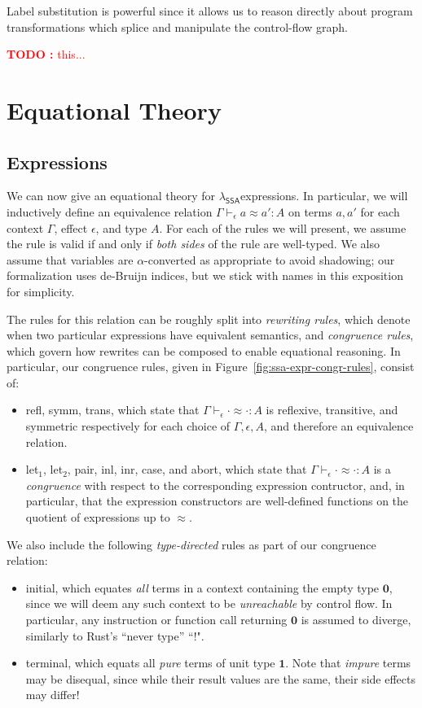 \documentclass[acmsmall,screen,review]{acmart}
\newcounter{todos}
\newcommand{\TODO}[1]{{
  \stepcounter{todos}
  \begin{center}\large{\textcolor{red}{\textbf{TODO \arabic{todos}:} #1}}\end{center}
}}
\newcommand{\mb}[1]{\ensuremath{\mathbf{#1}}}
\newcommand{\ms}[1]{\ensuremath{\mathsf{#1}}}
\newcommand{\teqv}{\approx}
\newcommand{\tmeq}[5]{#1 \vdash_{#2} #3 \teqv #4 : {#5}}
\newcommand{\brle}[1]{{\scriptsize\textsf{#1}}}
\newcommand{\isotopessa}{\(\lambda_{\ms{SSA}}\)}
\begin{document}
Label substitution is powerful since it allows us to reason directly about
program transformations which splice and manipulate the control-flow graph.

\TODO{this...}

\section{Equational Theory}

\label{sec:equations}

\subsection{Expressions}

We can now give an equational theory for \isotopessa expressions. In particular,
we will inductively define an equivalence relation
$
\tmeq{\Gamma}{\epsilon}{a}{a'}{A}
$
on terms $a, a'$ for each context $\Gamma$, effect $\epsilon$, and type $A$. For each of the rules
we will present, we assume the rule is valid if and only if \emph{both sides} of the rule are
well-typed. We also assume that variables are $\alpha$-converted as appropriate to avoid shadowing;
our formalization uses de-Bruijn indices, but we stick with names in this exposition for simplicity.

The rules for this relation can be roughly split into \emph{rewriting rules}, which denote when two
particular expressions have equivalent semantics, and \emph{congruence rules}, which govern how
rewrites can be composed to enable equational reasoning. In particular, our congruence rules, given
in Figure~\ref{fig:ssa-expr-congr-rules}, consist of:
\begin{itemize}
  \item \brle{refl}, \brle{symm}, \brle{trans}, which state that
  $\tmeq{\Gamma}{\epsilon}{\cdot}{\cdot}{A}$ is reflexive, transitive, and symmetric respectively
  for each choice of $\Gamma, \epsilon, A$, and therefore an equivalence relation.
  \item \brle{let$_1$}, \brle{let$_2$}, \brle{pair}, \brle{inl}, \brle{inr}, \brle{case}, and
  \brle{abort}, which state that $\tmeq{\Gamma}{\epsilon}{\cdot}{\cdot}{A}$ is a \emph{congruence}
  with respect to the corresponding expression contructor, and, in particular, that the expression
  constructors are well-defined functions on the quotient of expressions up to $\teqv$.
\end{itemize} 
We also include the following \emph{type-directed} rules as part of our congruence relation:
\begin{itemize}
  \item \brle{initial}, which equates \emph{all} terms in a context containing the empty type
  $\mb{0}$, since we will deem any such context to be \emph{unreachable} by control flow. In
  particular, any instruction or function call returning $\mb{0}$ is assumed to diverge, similarly
  to Rust's ``never type'' ``$!$".
  \item \brle{terminal}, which equats all \emph{pure} terms of unit type $\mb{1}$. Note that
  \emph{impure} terms may be disequal, since while their result values are the same, their side
  effects may differ!
\end{itemize}
\end{document}
